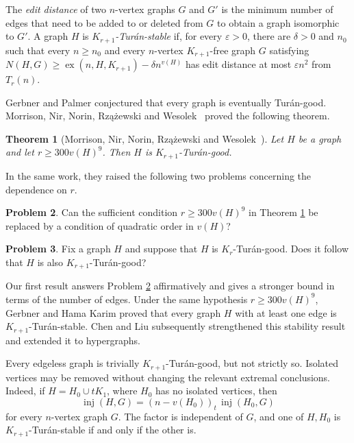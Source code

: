 \documentclass[11pt]{article}
\numberwithin{equation}{section}
\newtheorem{theorem}{Theorem}[section]
\theoremstyle{definition}
\newtheorem{problem}[theorem]{Problem}
\theoremstyle{remark}
\newcommand{\inj}{\operatorname{inj}}
\newcommand{\ex}{\operatorname{ex}}
\begin{document}
The \emph{edit distance} of two $n$-vertex graphs $G$ and $G'$ is the minimum number of edges that need to be added to or deleted from $G$ to obtain a graph isomorphic to $G'$. A graph $H$ is \emph{$K_{r+1}$-Tur\'an-stable} if, for every $\varepsilon>0$, there are $\delta>0$ and $n_0$ such that every $n\ge n_0$ and every $n$-vertex $K_{r+1}$-free graph $G$ satisfying $N(H,G)\ge \ex(n,H,K_{r+1})-\delta n^{v(H)}$ has edit distance at most $\varepsilon n^2$ from $T_r(n)$.

Gerbner and Palmer \cite{GerbnerPalmerCounting,GerbnerPalmerExact} conjectured that every graph is eventually Tur\'an-good. Morrison, Nir, Norin, Rz\k{a}\.zewski and Wesolek~\cite{MorrisonEtAl} proved the following theorem.

\begin{theorem}[Morrison, Nir, Norin, Rz\k{a}\.zewski and Wesolek~\cite{MorrisonEtAl}]
\label{thm:MNNRW}
Let $H$ be a graph and let $r\ge 300v(H)^9$. Then $H$ is $K_{r+1}$-Tur\'an-good.
\end{theorem}

In the same work, they raised the following two problems concerning the dependence on $r$.

\begin{problem}
\label{prob:quadratic-threshold}
Can the sufficient condition $r\ge 300v(H)^9$ in Theorem \ref{thm:MNNRW} be replaced by a condition of quadratic order in $v(H)$?
\end{problem}

\begin{problem}
\label{prob:monotonicity}
Fix a graph $H$ and suppose that $H$ is $K_r$-Tur\'an-good. Does it follow that $H$ is also $K_{r+1}$-Tur\'an-good?
\end{problem}

Our first result answers Problem \ref{prob:quadratic-threshold} affirmatively and gives a stronger bound in terms of the number of edges. Under the same hypothesis $r\ge 300v(H)^9$, Gerbner and Hama Karim \cite{GerbnerHamaKarim} proved that every graph $H$ with at least one edge is $K_{r+1}$-Tur\'an-stable. Chen and Liu \cite{ChenLiu} subsequently strengthened this stability result and extended it to hypergraphs.

Every edgeless graph is trivially $K_{r+1}$-Tur\'an-good, but not strictly so. Isolated vertices may be removed without changing the relevant extremal conclusions. Indeed, if $H=H_0\cup tK_1$, where $H_0$ has no isolated vertices, then
\[
\inj(H,G)=(n-v(H_0))_t\,\inj(H_0,G)
\]
for every $n$-vertex graph $G$. The factor is independent of $G$, and one of $H,H_0$ is $K_{r+1}$-Tur\'an-stable if and only if the other is.
\end{document}
